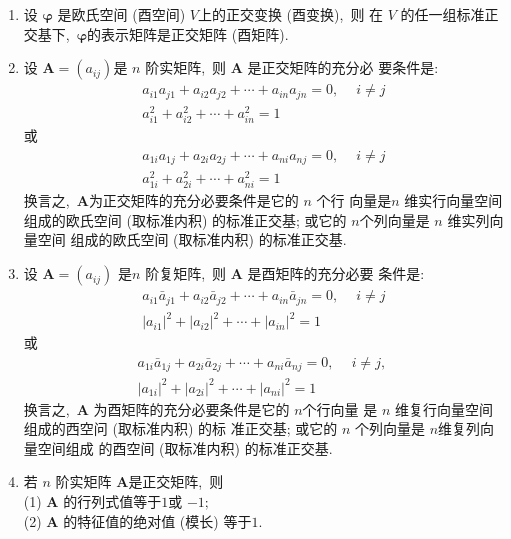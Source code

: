 \begin{enumerate}
		\item 设  $\boldsymbol{\varphi}$ 是欧氏空间 (酉空间) $ V  $上的正交变换 (酉变换),\  则 在  $V$  的任一组标准正交基下,\  $\boldsymbol{\varphi}$的表示矩阵是正交矩阵 (酉矩阵).
		\item 设 $ \boldsymbol{A}=\left(a_{i j}\right)  $是  $n $ 阶实矩阵,\  则  $\boldsymbol{A} $ 是正交矩阵的充分必 要条件是:
		$$\begin{array}{c}
			a_{i 1} a_{j 1}+a_{i 2} a_{j 2}+\cdots+a_{i n} a_{j n}=0,\  \quad i \neq j \\
			a_{i 1}^{2}+a_{i 2}^{2}+\cdots+a_{i n}^{2}=1
		\end{array}$$
		或
		$$\begin{array}{c}
			a_{1 i} a_{1 j}+a_{2 i} a_{2 j}+\cdots+a_{n i} a_{n j}=0,\  \quad i \neq j \\
			a_{1 i}^{2}+a_{2 i}^{2}+\cdots+a_{n i}^{2}=1
		\end{array}$$
		换言之,\  $ \boldsymbol{A}  $为正交矩阵的充分必要条件是它的 $ n$  个行 向量是$  n$  维实行向量空间组成的欧氏空间 (取标准内积) 的标准正交基; 或它的  $n  $个列向量是 $ n$  维实列向量空间 组成的欧氏空间 (取标准内积) 的标准正交基.
		\item 设 $ \boldsymbol{A}=\left(a_{i j}\right) $ 是$  n $ 阶复矩阵,\  则  $\boldsymbol{A} $ 是酉矩阵的充分必要 条件是:
		$$\begin{array}{c}
			a_{i 1} \bar{a}_{j 1}+a_{i 2} \bar{a}_{j 2}+\cdots+a_{i n} \bar{a}_{j n}=0,\  \quad i \neq j \\
			\left|a_{i 1}\right|^{2}+\left|a_{i 2}\right|^{2}+\cdots+\left|a_{i n}\right|^{2}=1
		\end{array}$$
		或
		$$\begin{array}{c}
			a_{1 i} \bar{a}_{1 j}+a_{2 i} \bar{a}_{2 j}+\cdots+a_{n i} \bar{a}_{n j}=0,\  \quad i \neq j,\  \\
			\left|a_{1 i}\right|^{2}+\left|a_{2 i}\right|^{2}+\cdots+\left|a_{n i}\right|^{2}=1
		\end{array}$$
		换言之,\  $ \boldsymbol{A} $ 为酉矩阵的充分必要条件是它的 $n  $个行向量 是  $n$  维复行向量空间组成的西空问 (取标准内积) 的标 准正交基; 或它的  $n$  个列向量是  $n  $维复列向量空间组成 的酉空间 (取标准内积) 的标准正交基.
		\item 若 $ n $ 阶实矩阵 $ \boldsymbol{A}  $是正交矩阵,\  则\\
		(1) $ \boldsymbol{A} $ 的行列式值等于$ 1 $或 $ -1 ;$\\
		(2)  $\boldsymbol{A}$  的特征值的绝对值 (模长) 等于$ 1.$\\

\end{enumerate}
